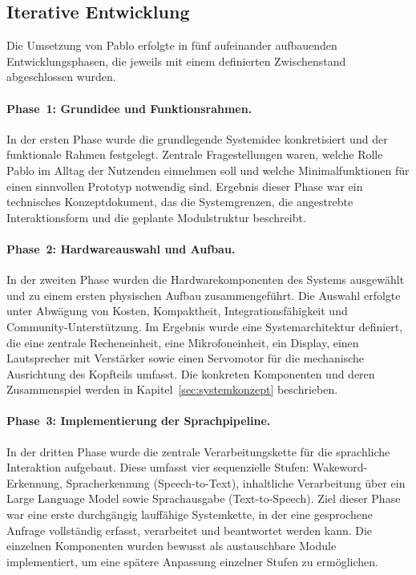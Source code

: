 \subsection{Iterative Entwicklung}

Die Umsetzung von Pablo erfolgte in fünf aufeinander aufbauenden Entwicklungsphasen, die jeweils mit einem definierten Zwischenstand abgeschlossen wurden.

\paragraph{Phase~1: Grundidee und Funktionsrahmen.}
In der ersten Phase wurde die grundlegende Systemidee konkretisiert und der funktionale Rahmen festgelegt.
Zentrale Fragestellungen waren, welche Rolle Pablo im Alltag der Nutzenden einnehmen soll und welche Minimalfunktionen für einen sinnvollen Prototyp notwendig sind.
Ergebnis dieser Phase war ein technisches Konzeptdokument, das die Systemgrenzen, die angestrebte Interaktionsform und die geplante Modulstruktur beschreibt.

\paragraph{Phase~2: Hardwareauswahl und Aufbau.}
In der zweiten Phase wurden die Hardwarekomponenten des Systems ausgewählt und zu einem ersten physischen Aufbau zusammengeführt.
Die Auswahl erfolgte unter Abwägung von Kosten, Kompaktheit, Integrationsfähigkeit und Community-Unterstützung.
Im Ergebnis wurde eine Systemarchitektur definiert, die eine zentrale Recheneinheit, eine Mikrofoneinheit, ein Display, einen Lautsprecher mit Verstärker sowie einen Servomotor für die mechanische Ausrichtung des Kopfteils umfasst.
Die konkreten Komponenten und deren Zusammenspiel werden in Kapitel~\ref{sec:systemkonzept} beschrieben.

\paragraph{Phase~3: Implementierung der Sprachpipeline.}
In der dritten Phase wurde die zentrale Verarbeitungskette für die sprachliche Interaktion aufgebaut.
Diese umfasst vier sequenzielle Stufen: Wakeword-Erkennung, Spracherkennung (Speech-to-Text), inhaltliche Verarbeitung über ein Large Language Model sowie Sprachausgabe (Text-to-Speech).
Ziel dieser Phase war eine erste durchgängig lauffähige Systemkette, in der eine gesprochene Anfrage vollständig erfasst, verarbeitet und beantwortet werden kann.
Die einzelnen Komponenten wurden bewusst als austauschbare Module implementiert, um eine spätere Anpassung einzelner Stufen zu ermöglichen.

